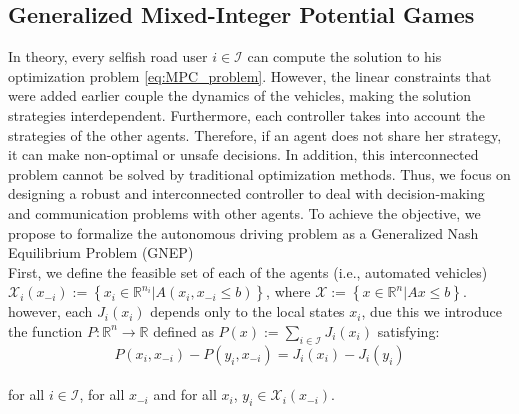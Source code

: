 




\subsection{Generalized Mixed-Integer Potential Games}

In theory, every selfish road user $i \in \mathcal{I}$ can compute the solution to his optimization problem \ref{eq:MPC_problem}. However, the linear constraints that were added earlier couple the dynamics of the vehicles, making the solution strategies interdependent. Furthermore, each controller takes into account the strategies of the other agents. Therefore, if an agent does not share her strategy, it can make non-optimal or unsafe decisions. In addition, this interconnected problem cannot be solved by traditional optimization methods. Thus, we focus on designing a robust and interconnected controller to deal with decision-making and communication problems with other agents. To achieve the objective, we propose to formalize the autonomous driving problem as a Generalized Nash Equilibrium Problem (GNEP) \cite{18t_article}
\\

First, we define the feasible set of each of the agents (i.e., automated vehicles) $\mathcal{X}_i(x_{-i}):=\left\{ x_i \in \mathbb{R}^{n_i}  | A(x_i, x_{-i} \leq b)\right\}$, where $\mathcal{X}:= \left\{ x \in \mathbb{R}^n | Ax \leq b  \right\}$. however, each $J_i(x_i)$ depends only to the local states $x_i$, due this we introduce the function $P: \mathbb{R}^n \to \mathbb{R}$ defined as $P(x):= \sum_{i\in \mathcal{I}}{J_i(x_i)}$ satisfying:
\\
\begin{equation*}
    P(x_i, x_{-i})-P(y_i, x_{-i}) = J_i(x_i) - J_i(y_i)
\end{equation*}
\\

for all $i \in \mathcal{I}$, for all $x_{-i}$ and for all $x_i$, $y_{i}\in \mathcal{X}_i(x_{-i})$.

